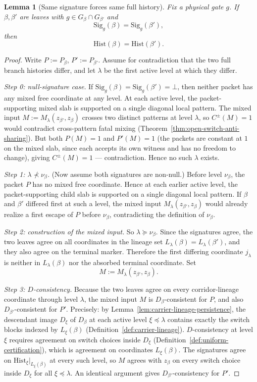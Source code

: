 \documentclass[11pt]{article}
\newtheorem{lemma}[theorem]{Lemma}
\begin{document}
\begin{lemma}[Same signature forces same full history]
\label{lem:signature-injectivity}
Fix a physical gate $g$.  If $\beta, \beta'$ are leaves with
$g \in G_\beta \cap G_{\beta'}$ and
\[
\mathrm{Sig}_g(\beta) = \mathrm{Sig}_g(\beta'),
\]
then
\[
\mathrm{Hist}(\beta) = \mathrm{Hist}(\beta').
\]
\end{lemma}

\begin{proof}
Write $P := P_\beta$, $P' := P_{\beta'}$.  Assume for contradiction that
the two full branch histories differ, and let $\lambda$ be the first
active level at which they differ.

\emph{Step 0: null-signature case.}
If $\mathrm{Sig}_g(\beta) = \mathrm{Sig}_g(\beta') = \bot$, then
neither packet has any mixed free coordinate at any level.  At each
active level, the packet-supporting mixed slab is supported on a single
diagonal local pattern.  The mixed input $M := M_\lambda(z_{\beta'},
z_\beta)$ crosses two distinct patterns at level $\lambda$, so
$C^{\pm}(M) = 1$ would contradict cross-pattern fatal mixing
(Theorem~\ref{thm:open-switch-anti-sharing}).  But both $P(M) = 1$ and
$P'(M) = 1$ (the packets are constant at $1$ on the mixed slab, since
each accepts its own witness and has no freedom to change), giving
$C^{\pm}(M) = 1$ --- contradiction.  Hence no such $\lambda$ exists.

\emph{Step 1: $\lambda \not\prec \nu_\beta$.} (Now assume both
signatures are non-null.)
Before level $\nu_\beta$, the packet $P$ has no mixed free coordinate.
Hence at each earlier active level, the packet-supporting child slab is
supported on a single diagonal local pattern.  If $\beta$ and $\beta'$
differed first at such a level, the mixed input
$M_\lambda(z_{\beta'}, z_\beta)$ would already realize a first escape of
$P$ before $\nu_\beta$, contradicting the definition of $\nu_\beta$.

\emph{Step 2: construction of the mixed input.}
So $\lambda \succeq \nu_\beta$.  Since the signatures agree, the two
leaves agree on all coordinates in the lineage set
$L_\lambda(\beta) = L_\lambda(\beta')$, and they also agree on the
terminal marker.  Therefore the first differing coordinate $j_\lambda$
is neither in $L_\lambda(\beta)$ nor the absorbed terminal coordinate.
Set
\[
M := M_\lambda(z_{\beta'}, z_\beta).
\]

\emph{Step 3: $D$-consistency.}
Because the two leaves agree on every corridor-lineage coordinate
through level $\lambda$, the mixed input $M$ is $D_\beta$-consistent
for $P$, and also $D_{\beta'}$-consistent for $P'$.  Precisely: by
Lemma~\ref{lem:carrier-lineage-persistence}, the descendant image
$D_\xi$ of $D_\beta$ at each active level $\xi \preceq \lambda$ contains
exactly the switch blocks indexed by $L_\xi(\beta)$
(Definition~\ref{def:carrier-lineage}).  $D$-consistency at level $\xi$
requires agreement on switch choices inside $D_\xi$
(Definition~\ref{def:uniform-certification}), which is agreement on
coordinates $L_\xi(\beta)$.  The signatures agree on
$\mathrm{Hist}_\xi|_{L_\xi(\beta)}$ at every such level, so $M$
agrees with $z_\beta$ on every switch choice inside $D_\xi$ for all
$\xi \preceq \lambda$.  An identical argument gives
$D_{\beta'}$-consistency for $P'$.


\end{proof}
\end{document}
